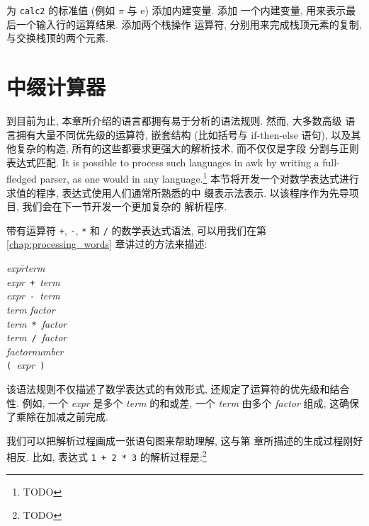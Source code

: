 \begin{exercise}
    为 \texttt{calc2} 的标准值 (例如 $\pi$ 与 $\mathrm{e}$) 添加内建变量.
    添加 一个内建变量, 用来表示最后一个输入行的运算结果. 添加两个栈操作
    运算符, 分别用来完成栈顶元素的复制, 与交换栈顶的两个元素.
\end{exercise}

\section{中缀计算器}
\label{sec:an_infix_calculator}

到目前为止, 本章所介绍的语言都拥有易于分析的语法规则. 然而, 大多数高级
语言拥有大量不同优先级的运算符, 嵌套结构 (比如括号与 if-then-else 语句),
以及其他复杂的构造, 所有的这些都要求更强大的解析技术, 而不仅仅是字段
分割与正则表达式匹配. It is possible to process such languages in awk by
writing a full-fledged parser, as one would in any language.\footnote{TODO}
本节将开发一个对数学表达式进行求值的程序, 表达式使用人们通常所熟悉的中
缀表示法表示. 以该程序作为先导项目, 我们会在下一节开发一个更加复杂的
解析程序.

带有运算符 \verb'+', \verb'-', \verb'*' 和 \verb'/' 的数学表达式语法,
可以用我们在第 \ref{chap:processing_words} 章讲过的方法来描述:
\begin{tabbing}
    \textit{expr}\hspace{2em}\=\to\hspace{2em}\=\textit{term} \\
    \> \> \textit{expr}\ \verb'+'\ \textit{term} \\
    \> \> \textit{expr}\ \verb'-'\ \textit{term} \\
    \textit{term} \> \to \> \textit{factor} \\
    \> \> \textit{term}\ \verb'*'\ \textit{factor} \\
    \> \> \textit{term}\ \verb'/'\ \textit{factor} \\
    \textit{factor}\>\to\>\textit{number} \\
    \> \> \verb'('\ \textit{expr}\ \verb')'
\end{tabbing}

该语法规则不仅描述了数学表达式的有效形式, 还规定了运算符的优先级和结合
性. 例如, 一个 \textit{expr} 是多个 \textit{term} 的和或差, 一个 
\textit{term} 由多个 \textit{factor} 组成, 这确保了乘除在加减之前完成.

我们可以把解析过程画成一张语句图来帮助理解, 这与第
 章所描述的生成过程刚好相反. 比如, 表达式 
\texttt{1 + 2 * 3} 的解析过程是:\footnote{TODO}

